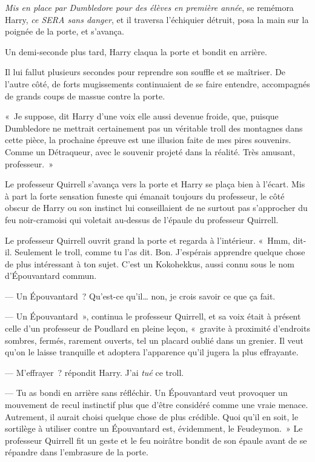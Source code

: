 \emph{Mis en place par Dumbledore pour des élèves en première année}, se remémora Harry, \emph{ce SERA sans danger}, et il traversa l'échiquier détruit, posa la main sur la poignée de la porte, et s'avança.

\later

Un demi-seconde plus tard, Harry claqua la porte et bondit en arrière.

Il lui fallut plusieurs secondes pour reprendre son souffle et se maîtriser. De l'autre côté, de forts mugissements continuaient de se faire entendre, accompagnés de grands coups de massue contre la porte.

«~Je suppose, dit Harry d'une voix elle aussi devenue froide, que, puisque Dumbledore ne mettrait certainement pas un véritable troll des montagnes dans cette pièce, la prochaine épreuve est une illusion faite de mes pires souvenirs. Comme un Détraqueur, avec le souvenir projeté dans la réalité. Très amusant, professeur.~»

Le professeur Quirrell s'avança vers la porte et Harry se plaça bien à l'écart. Mis à part la forte sensation funeste qui émanait toujours du professeur, le côté obscur de Harry ou son instinct lui conseillaient de ne surtout pas s'approcher du feu noir-cramoisi qui voletait au-dessus de l'épaule du professeur Quirrell.

Le professeur Quirrell ouvrit grand la porte et regarda à l'intérieur. «~Hmm, dit-il. Seulement le troll, comme tu l'as dit. Bon. J'espérais apprendre quelque chose de plus intéressant à ton sujet. C'est un Kokohekkus, aussi connu sous le nom d'Épouvantard commun.

--- Un Épouvantard~? Qu'est-ce qu'il… non, je crois savoir ce que ça fait.

--- Un Épouvantard~», continua le professeur Quirrell, et sa voix était à présent celle d'un professeur de Poudlard en pleine leçon, «~gravite à proximité d'endroits sombres, fermés, rarement ouverts, tel un placard oublié dans un grenier. Il veut qu'on le laisse tranquille et adoptera l'apparence qu'il jugera la plus effrayante.

--- M'effrayer~? répondit Harry. J'ai \emph{tué} ce troll.

--- Tu as bondi en arrière sans réfléchir. Un Épouvantard veut provoquer un mouvement de recul instinctif plus que d'être considéré comme une vraie menace. Autrement, il aurait choisi quelque chose de plus crédible. Quoi qu'il en soit, le sortilège à utiliser contre un Épouvantard est, évidemment, le Feudeymon.~» Le professeur Quirrell fit un geste et le feu noirâtre bondit de son épaule avant de se répandre dans l'embrasure de la porte.

